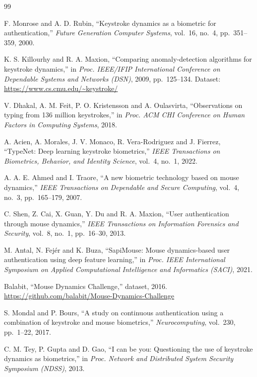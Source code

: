 \documentclass[10pt,letterpaper]{article}
\begin{document}
\begin{thebibliography}{99}
\setlength{\itemsep}{0pt}\setlength{\parsep}{0pt}
\footnotesize

 F. Monrose and A. D. Rubin, ``Keystroke dynamics as a biometric for authentication,'' \emph{Future Generation Computer Systems}, vol.~16, no.~4, pp.~351--359, 2000.

 K. S. Killourhy and R. A. Maxion, ``Comparing anomaly-detection algorithms for keystroke dynamics,'' in \emph{Proc. IEEE/IFIP International Conference on Dependable Systems and Networks (DSN)}, 2009, pp.~125--134. Dataset: \url{https://www.cs.cmu.edu/~keystroke/}

 V. Dhakal, A. M. Feit, P. O. Kristensson and A. Oulasvirta, ``Observations on typing from 136 million keystrokes,'' in \emph{Proc. ACM CHI Conference on Human Factors in Computing Systems}, 2018.

 A. Acien, A. Morales, J. V. Monaco, R. Vera-Rodriguez and J. Fierrez, ``TypeNet: Deep learning keystroke biometrics,'' \emph{IEEE Transactions on Biometrics, Behavior, and Identity Science}, vol.~4, no.~1, 2022.

 A. A. E. Ahmed and I. Traore, ``A new biometric technology based on mouse dynamics,'' \emph{IEEE Transactions on Dependable and Secure Computing}, vol.~4, no.~3, pp.~165--179, 2007.

 C. Shen, Z. Cai, X. Guan, Y. Du and R. A. Maxion, ``User authentication through mouse dynamics,'' \emph{IEEE Transactions on Information Forensics and Security}, vol.~8, no.~1, pp.~16--30, 2013.

 M. Antal, N. Fej\'er and K. Buza, ``SapiMouse: Mouse dynamics-based user authentication using deep feature learning,'' in \emph{Proc. IEEE International Symposium on Applied Computational Intelligence and Informatics (SACI)}, 2021.

 Balabit, ``Mouse Dynamics Challenge,'' dataset, 2016. \url{https://github.com/balabit/Mouse-Dynamics-Challenge}

 S. Mondal and P. Bours, ``A study on continuous authentication using a combination of keystroke and mouse biometrics,'' \emph{Neurocomputing}, vol.~230, pp.~1--22, 2017.

 C. M. Tey, P. Gupta and D. Gao, ``I can be you: Questioning the use of keystroke dynamics as biometrics,'' in \emph{Proc. Network and Distributed System Security Symposium (NDSS)}, 2013.


\end{thebibliography}
\end{document}
